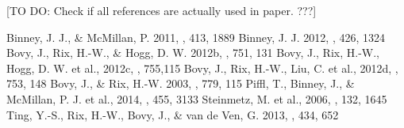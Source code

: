 \documentclass[12pt,preprint]{aastex}
\begin{document}

[TO DO: Check if all references are actually used in paper. ???]

\begin{thebibliography}{}
 Binney, J. J., \& McMillan, P. 2011, \mnras, 413, 1889
 Binney, J. J. 2012, \mnras, 426, 1324
 Bovy, J., Rix, H.-W., \& Hogg, D. W. 2012b, \apj, 751, 131
 Bovy, J., Rix, H.-W., Hogg, D. W. et al., 2012c, \apj, 755,115
 Bovy, J., Rix, H.-W., Liu, C. et al., 2012d, \apj, 753, 148
  Bovy, J., \& Rix, H.-W. 2003, \apj, 779, 115
 Piffl, T., Binney, J., \& McMillan, P. J. et al., 2014, \mnras, 455, 3133
 Steinmetz, M. et al., 2006, \aj, 132, 1645
 Ting, Y.-S., Rix, H.-W., Bovy, J., \& van de Ven, G. 2013, \mnras, 434, 652
\end{thebibliography}
\end{document}

